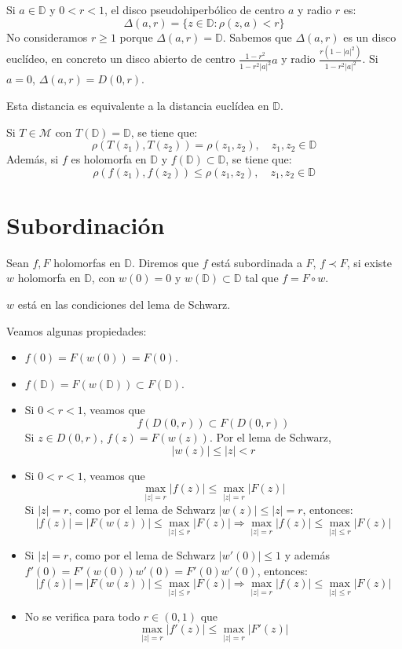 Si $a \in \mathbb{D}$ y $0 < r < 1$, el disco pseudohiperbólico de centro $a$ y radio $r$ es:
$$\Delta(a, r) = \{z \in \mathbb{D} : \rho(z, a) < r\}$$
No consideramos $r \geq 1$ porque $\Delta(a, r) = \mathbb{D}$.
Sabemos que $\Delta(a, r)$ es un disco euclídeo, en concreto un disco abierto de centro $\frac{1-r^2}{1-r^2|a|^2}a$ y radio $\frac{r(1-|a|^2)}{1-r^2|a|^2}$.
Si $a = 0$, $\Delta(a, r) = D(0, r)$.

Esta distancia es equivalente a la distancia euclídea en $\mathbb{D}$.

Si $T \in \mathcal{M}$ con $T(\mathbb{D}) = \mathbb{D}$, se tiene que:
$$\rho(T(z_1), T(z_2)) = \rho(z_1, z_2), \quad z_1, z_2 \in \mathbb{D}$$
Además, si $f$ es holomorfa en $\mathbb{D}$ y $f(\mathbb{D}) \subset \mathbb{D}$, se tiene que:
$$\rho(f(z_1), f(z_2)) \leq \rho(z_1, z_2), \quad z_1, z_2 \in \mathbb{D}$$

\section{Subordinación}
\begin{definition}
    Sean $f, F$ holomorfas en $\mathbb{D}$.
    Diremos que $f$ está subordinada a $F$, $f \prec F$, si existe $w$ holomorfa en $\mathbb{D}$, con $w(0) = 0$ y $w(\mathbb{D}) \subset \mathbb{D}$ tal que $f = F \circ w$.
\end{definition}

\begin{remark}
    $w$ está en las condiciones del lema de Schwarz.
\end{remark}

Veamos algunas propiedades:
\begin{itemize}
    \item $f(0) = F(w(0)) = F(0)$.
    \item $f(\mathbb{D}) = F(w(\mathbb{D})) \subset F(\mathbb{D})$.
    \item Si $0 < r < 1$, veamos que
          $$f(D(0, r)) \subset F(D(0, r))$$
          Si $z \in D(0, r)$, $f(z) = F(w(z))$.
          Por el lema de Schwarz,
          $$|w(z)| \leq |z| < r$$
    \item Si $0 < r < 1$, veamos que
          $$\max_{|z|=r} |f(z)| \leq \max_{|z|=r} |F(z)|$$
          Si $|z| = r$, como por el lema de Schwarz $|w(z)| \leq |z| = r$, entonces:
          $$|f(z)| = |F(w(z))| \leq \max_{|z| \leq r} |F(z)| \Rightarrow \max_{|z|=r} |f(z)| \leq \max_{|z| \leq r} |F(z)|$$
    \item Si $|z| = r$, como por el lema de Schwarz $|w'(0)| \leq 1$ y además $f'(0) = F'(w(0))w'(0) = F'(0)w'(0)$, entonces:
          $$|f(z)| = |F(w(z))| \leq \max_{|z| \leq r} |F(z)| \Rightarrow \max_{|z|=r} |f(z)| \leq \max_{|z| \leq r} |F(z)|$$
    \item No se verifica para todo $r \in (0, 1)$ que
          $$\max_{|z|=r} |f'(z)| \leq \max_{|z|=r} |F'(z)|$$
\end{itemize}

